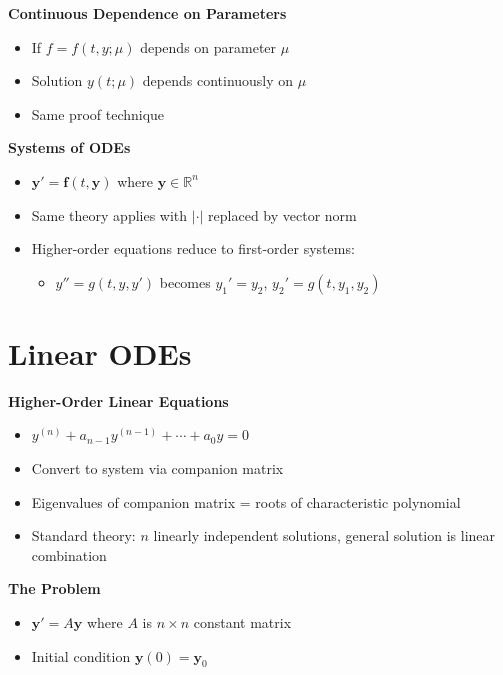 \documentclass[
  10pt,
  letterpaper,
]{scrbook}
\providecommand{\tightlist}{%
  \setlength{\itemsep}{0pt}\setlength{\parskip}{0pt}}
\begin{document}
\textbf{Continuous Dependence on Parameters}

\begin{itemize}
\tightlist
\item
  If \(f = f(t, y; \mu)\) depends on parameter \(\mu\)
\item
  Solution \(y(t; \mu)\) depends continuously on \(\mu\)
\item
  Same proof technique
\end{itemize}

\textbf{Systems of ODEs}

\begin{itemize}
\tightlist
\item
  \(\mathbf{y}' = \mathbf{f}(t, \mathbf{y})\) where
  \(\mathbf{y} \in \mathbb{R}^n\)
\item
  Same theory applies with \(|\cdot|\) replaced by vector norm
\item
  Higher-order equations reduce to first-order systems:

  \begin{itemize}
  \tightlist
  \item
    \(y'' = g(t, y, y')\) becomes \(y_1' = y_2\),
    \(y_2' = g(t, y_1, y_2)\)
  \end{itemize}
\end{itemize}

\section{Linear ODEs}\label{linear-odes}

\textbf{Higher-Order Linear Equations}

\begin{itemize}
\tightlist
\item
  \(y^{(n)} + a_{n-1}y^{(n-1)} + \cdots + a_0 y = 0\)
\item
  Convert to system via companion matrix
\item
  Eigenvalues of companion matrix = roots of characteristic polynomial
\item
  Standard theory: \(n\) linearly independent solutions, general
  solution is linear combination
\end{itemize}

\textbf{The Problem}

\begin{itemize}
\tightlist
\item
  \(\mathbf{y}' = A\mathbf{y}\) where \(A\) is \(n \times n\) constant
  matrix
\item
  Initial condition \(\mathbf{y}(0) = \mathbf{y}_0\)
\end{itemize}
\end{document}
